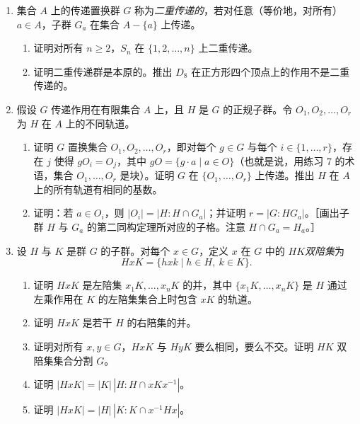 \begin{enumerate}[label=\arabic*.]
  \begin{enumerate}[label=(\alph*)]
    \item 证明：若 $B$ 是包含 $A$ 中元素 $a$ 的块，则集合 $G_B=\{\sigma\in G\mid \sigma(B)=B\}$ 是包含 $G_a$ 的 $G$ 的子群。
    \item 证明：若 $B$ 是一个块，并且 $\sigma_1(B),\sigma_2(B),\ldots,\sigma_n(B)$ 是 $B$ 在 $G$ 的元素下的全部不同像，则这些集合构成 $A$ 的一个分割。
    \item 若传递群 $G$ 在集合 $A$ 上的块只有平凡块（大小为 $1$ 的集合与 $A$ 本身），则称 $G$ 在 $A$ 上是\emph{本原的}。证明 $S_4$ 在 $A=\{1,2,3,4\}$ 上是本原的。证明 $D_8$ 作为正方形四个顶点上的置换群不是本原的。
    \item 证明：传递群 $G$ 在 $A$ 上是本原的，当且仅当对每个 $a\in A$，包含 $G_a$ 的 $G$ 的子群只有 $G_a$ 与 $G$（即 $G_a$ 是 $G$ 的极大子群，参见第 2.4 节练习 16）。［用 (a)。］
  \end{enumerate}
  \item 集合 $A$ 上的传递置换群 $G$ 称为\emph{二重传递的}，若对任意（等价地，对所有）$a\in A$，子群 $G_a$ 在集合 $A-\{a\}$ 上传递。
  \begin{enumerate}[label=(\alph*)]
    \item 证明对所有 $n\geq2$，$S_n$ 在 $\{1,2,\ldots,n\}$ 上二重传递。
    \item 证明二重传递群是本原的。推出 $D_8$ 在正方形四个顶点上的作用不是二重传递的。
  \end{enumerate}
  \item 假设 $G$ 传递作用在有限集合 $A$ 上，且 $H$ 是 $G$ 的正规子群。令 $O_1,O_2,\ldots,O_r$ 为 $H$ 在 $A$ 上的不同轨道。
  \begin{enumerate}[label=(\alph*)]
    \item 证明 $G$ 置换集合 $O_1,O_2,\ldots,O_r$，即对每个 $g\in G$ 与每个 $i\in\{1,\ldots,r\}$，存在 $j$ 使得 $gO_i=O_j$，其中 $gO=\{g\cdot a\mid a\in O\}$（也就是说，用练习 7 的术语，集合 $O_1,\ldots,O_r$ 是块）。证明 $G$ 在 $\{O_1,\ldots,O_r\}$ 上传递。推出 $H$ 在 $A$ 上的所有轨道有相同的基数。
    \item 证明：若 $a\in O_i$，则 $|O_i|=|H:H\cap G_a|$；并证明 $r=|G:HG_a|$。［画出子群 $H$ 与 $G_a$ 的第二同构定理所对应的子格。注意 $H\cap G_a=H_a$。］
  \end{enumerate}
  \item 设 $H$ 与 $K$ 是群 $G$ 的子群。对每个 $x\in G$，定义 $x$ 在 $G$ 中的 $HK$\emph{双陪集}为
  \[
    HxK=\{hxk\mid h\in H,\ k\in K\}.
  \]
  \begin{enumerate}[label=(\alph*)]
    \item 证明 $HxK$ 是左陪集 $x_1K,\ldots,x_nK$ 的并，其中 $\{x_1K,\ldots,x_nK\}$ 是 $H$ 通过左乘作用在 $K$ 的左陪集集合上时包含 $xK$ 的轨道。
    \item 证明 $HxK$ 是若干 $H$ 的右陪集的并。
    \item 证明对所有 $x,y\in G$，$HxK$ 与 $HyK$ 要么相同，要么不交。证明 $HK$ 双陪集集合分割 $G$。
    \item 证明 $|HxK|=|K|\,|H:H\cap xKx^{-1}|$。
    \item 证明 $|HxK|=|H|\,|K:K\cap x^{-1}Hx|$。
  \end{enumerate}
\end{enumerate}

